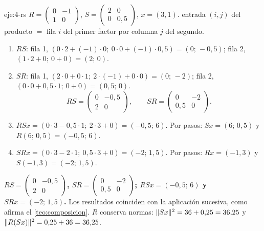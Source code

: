 \begin{solucion}{eje:4-rs}
\datos $R=\begin{pmatrix}0&-1\\1&0\end{pmatrix}$, $S=\begin{pmatrix}2&0\\0&0{,}5\end{pmatrix}$, $x=(3,1)$.
\planteamiento entrada $(i,j)$ del producto $=$ fila $i$ del primer factor por columna $j$ del segundo.
\pasos
\begin{enumerate}[label=\arabic*.]
  \item $RS$: fila 1, $(0\cdot 2+(-1)\cdot 0;\ 0\cdot 0+(-1)\cdot 0{,}5)=(0;\,-0{,}5)$; fila 2, $(1\cdot 2+0;\ 0+0)=(2;\,0)$.
  \item $SR$: fila 1, $(2\cdot 0+0\cdot 1;\ 2\cdot(-1)+0\cdot 0)=(0;\,-2)$; fila 2, $(0\cdot 0+0{,}5\cdot 1;\ 0+0)=(0{,}5;\,0)$.
  \[
  RS=\begin{pmatrix}0&-0{,}5\\2&0\end{pmatrix},\qquad SR=\begin{pmatrix}0&-2\\0{,}5&0\end{pmatrix}.
  \]
  \item $RSx=(0\cdot 3-0{,}5\cdot 1;\ 2\cdot 3+0)=(-0{,}5;\,6)$. Por pasos: $Sx=(6;\,0{,}5)$ y $R(6;\,0{,}5)=(-0{,}5;\,6)$.
  \item $SRx=(0\cdot 3-2\cdot 1;\ 0{,}5\cdot 3+0)=(-2;\,1{,}5)$. Por pasos: $Rx=(-1,3)$ y $S(-1,3)=(-2;\,1{,}5)$.
\end{enumerate}
\resultado \textbf{$RS=\begin{pmatrix}0&-0{,}5\\2&0\end{pmatrix}$, $SR=\begin{pmatrix}0&-2\\0{,}5&0\end{pmatrix}$; $RSx=(-0{,}5;\,6)$ y $SRx=(-2;\,1{,}5)$.} Los resultados coinciden con la aplicación sucesiva, como afirma el \cref{teo:composicion}.
\comprobacion $R$ conserva normas: $\lVert Sx\rVert^{2}=36+0{,}25=36{,}25$ y $\lVert R(Sx)\rVert^{2}=0{,}25+36=36{,}25$.
\end{solucion}

